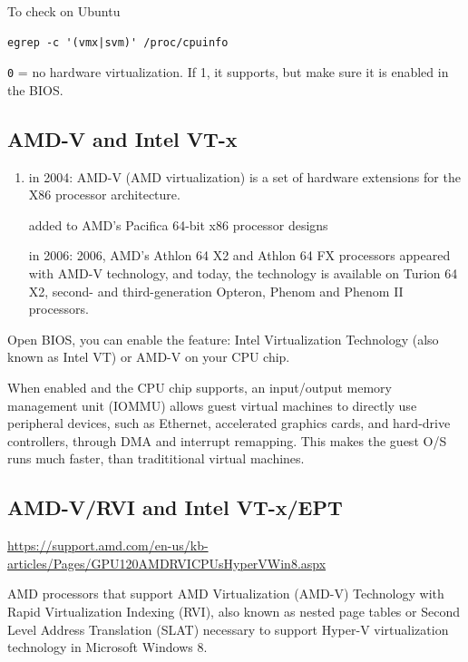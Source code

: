 To check on Ubuntu
\begin{verbatim}
egrep -c '(vmx|svm)' /proc/cpuinfo
\end{verbatim}
\verb!0! = no hardware virtualization. If 1, it supports, but make sure it is
enabled in the BIOS. 

\subsection{AMD-V and Intel VT-x}
\label{sec:AMD-V}

\begin{enumerate}
  \item in 2004: AMD-V (AMD virtualization) is a set of hardware extensions for the X86 processor architecture.

added to AMD's Pacifica 64-bit x86 processor designs
  
in 2006: 2006, AMD's Athlon 64 X2 and Athlon 64 FX processors appeared with
AMD-V technology, and today, the technology is available on Turion 64 X2,
second- and third-generation Opteron, Phenom and Phenom II processors.
  
\end{enumerate}




Open BIOS, you can enable the feature:	Intel Virtualization Technology (also
known as Intel VT) or AMD-V on your CPU chip. 

When enabled and the CPU chip supports, an input/output memory management unit
(IOMMU) allows guest virtual machines to directly use peripheral devices, such
as Ethernet, accelerated graphics cards, and hard-drive controllers, through DMA
and interrupt remapping. This makes the guest O/S runs much faster, than
tradititional virtual machines.


\subsection{AMD-V/RVI and Intel VT-x/EPT}
\label{sec:AMD-V/RVI}

\url{https://support.amd.com/en-us/kb-articles/Pages/GPU120AMDRVICPUsHyperVWin8.aspx}

AMD processors that support AMD Virtualization (AMD-V) Technology with Rapid
Virtualization Indexing (RVI), also known as nested page tables or Second Level
Address Translation (SLAT) necessary to support Hyper-V virtualization
technology in Microsoft Windows 8.



